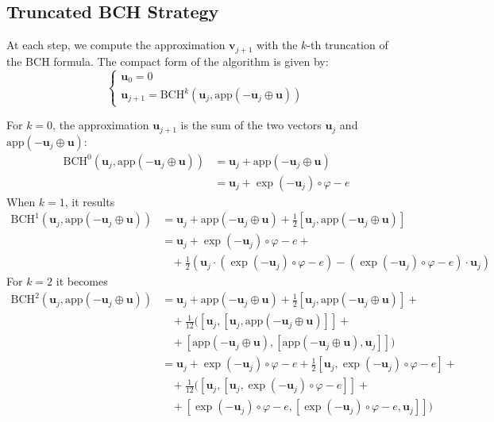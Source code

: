 \subsection{Truncated BCH Strategy}
At each step, we compute the approximation $\mathbf{v}_{j+1}$ with the $k$-th truncation of the BCH formula. The compact form of the algorithm is given by:
\begin{equation}\label{eq:bossa_bch_strat}
\begin{cases}
\mathbf{u}_0 = 0 \\
\mathbf{u}_{j+1} = \text{BCH}^{k}(\mathbf{u}_{j}, \text{app}(-\mathbf{u}_{j}  \oplus  \mathbf{u} ))
\end{cases}
\end{equation}

For $k = 0$, the approximation $\mathbf{u}_{j+1}$ is the sum of the two vectors $\mathbf{u}_{j}$ and $ \text{app}(-\mathbf{u}_{j}  \oplus  \mathbf{u} )$:
\begin{align*}
\text{BCH}^{0}(\mathbf{u}_{j}, \text{app}(-\mathbf{u}_{j}  \oplus  \mathbf{u} ))
&=
\mathbf{u}_{j} + \text{app}(-\mathbf{u}_{j}  \oplus  \mathbf{u} )\\
&=
\mathbf{u}_{j} + \exp(-\mathbf{u}_{j})\circ \varphi  - e 
\end{align*}
When $k=1$, it results 
\begin{align*}
\text{BCH}^{1}(\mathbf{u}_{j}, \text{app}(-\mathbf{u}_{j}  \oplus  \mathbf{u} ))
&=
\mathbf{u}_{j} +  \text{app}(-\mathbf{u}_{j}  \oplus  \mathbf{u} ) + \frac{1}{2}[\mathbf{u}_{j},  \text{app}(-\mathbf{u}_{j}  \oplus  \mathbf{u} )]\\
&=
\mathbf{u}_{j} + \exp(-\mathbf{u}_{j})\circ \varphi  - e + \\
&~~~~+ \frac{1}{2}(  \mathbf{u}_{j}\cdot( \exp(-\mathbf{u}_{j})\circ \varphi  - e) -  ( \exp(-\mathbf{u}_{j})\circ \varphi - e)\cdot\mathbf{u}_{j})
\end{align*}
For $k=2$ it becomes
\begin{align*}
\text{BCH}^{2}(\mathbf{u}_{j}, \text{app}(-\mathbf{u}_{j}  \oplus  \mathbf{u} ))
&=
\mathbf{u}_{j} +  \text{app}(-\mathbf{u}_{j}  \oplus  \mathbf{u} ) 
+ \frac{1}{2}[\mathbf{u}_{j},  \text{app}(-\mathbf{u}_{j}  \oplus  \mathbf{u} )] + \\
&~~~~+ \frac{1}{12}\Big([\mathbf{u}_{j},  [\mathbf{u}_{j},  \text{app}(-\mathbf{u}_{j}  \oplus  \mathbf{u} )]] +\\
&~~~~+ [\text{app}(-\mathbf{u}_{j}  \oplus  \mathbf{u} ),  [\text{app}(-\mathbf{u}_{j}  \oplus  \mathbf{u} ) ,\mathbf{u}_{j}  ]] \Big)\\
&=
\mathbf{u}_{j} + \exp(-\mathbf{u}_{j})\circ \varphi  - e 
+ \frac{1}{2}[\mathbf{u}_{j},  \exp(-\mathbf{u}_{j})\circ \varphi  - e ] + \\
&~~~~+ \frac{1}{12}\Big([\mathbf{u}_{j},  [\mathbf{u}_{j},  \exp(-\mathbf{u}_{j}) \circ\varphi  - e ]]+\\
&~~~~+ [\exp(-\mathbf{u}_{j})\circ \varphi  - e ,  [\exp(-\mathbf{u}_{j}) \circ\varphi - e  ,\mathbf{u}_{j}  ]] \Big)\\
\end{align*}

